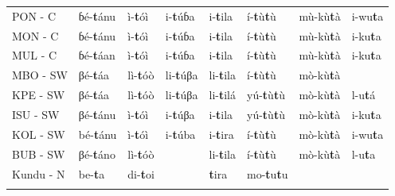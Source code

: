 \documentclass[output=paper,colorlinks,citecolor=brown
]{langscibook}
\begin{document}
\begin{table}[p]
{\begin{tabular}{llllllll}
PON - C                   & ɓé-\textbf{t}ánu                & ì-\textbf{t}óì              & i-\textbf{t}úɓa                  & i-\textbf{t}ila                 & í-\textbf{t}ù\textbf{t}ù               & mù-kù\textbf{t}à            & i-wu\textbf{t}a                 \\
MON - C                   & ɓé-\textbf{t}ánu                & ì-\textbf{t}óì              & i-\textbf{t}úɓa                  & i-\textbf{t}ila                 & í-\textbf{t}ù\textbf{t}ù               & mù-kù\textbf{t}à            & i-ku\textbf{t}a                 \\
MUL - C                   & ɓé-\textbf{t}áan                & ì-\textbf{t}óì              & i-\textbf{t}úɓa                  & i-\textbf{t}ila                 & í-\textbf{t}ù\textbf{t}ù               & mù-kù\textbf{t}à            & i-ku\textbf{t}a                 \\
MBO - SW                  & βé-\textbf{t}áa                 & lì-\textbf{t}óò             & li-\textbf{t}úβa                 & li-\textbf{t}ila                & í-\textbf{t}ù\textbf{t}ù               & mò-kù\textbf{t}à            &                        \\
KPE - SW                  & βé-\textbf{t}áa                 & lì-\textbf{t}óò             & li-\textbf{t}úβa                 & li-\textbf{t}ilá               & yú-\textbf{t}ù\textbf{t}ù              & mò-kù\textbf{t}à            & l-u\textbf{t}á                 \\
ISU - SW                  & βé-\textbf{t}ánu                & ì-\textbf{t}óì              & i-\textbf{t}úβa                  & i-\textbf{t}ila                 & yú-\textbf{t}ù\textbf{t}ù              & mò-kù\textbf{t}à            & i-ku\textbf{t}a                 \\
KOL - SW                  & bé-\textbf{t}ánu                & ì-\textbf{t}óì              & i-\textbf{t}úba                  & i-\textbf{t}ira                 & í-\textbf{t}ù\textbf{t}ù               & mò-kù\textbf{t}à            & i-wu\textbf{t}a                 \\
BUB - SW                  & βé-\textbf{t}áno                & lì-\textbf{t}óò             &                         & li-\textbf{t}ila                & í-\textbf{t}ù\textbf{t}ù               & mò-kù\textbf{t}à            & l-u\textbf{t}a                  \\
Kundu - N                 & be-\textbf{t}a                  & di-\textbf{t}oi                &                         & \textbf{t}ira                   & mo-\textbf{t}u\textbf{t}u                 &                       &        \\ 
   \lspbottomrule
 \end{tabular}
 }
\end{table}
\end{document}
